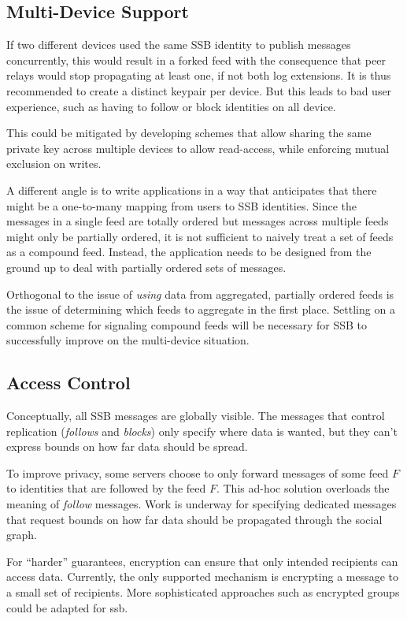 \documentclass[10pt,sigconf,rewiew]{acmart}
\begin{document}
\subsection{Multi-Device Support}

If two different devices used the same SSB identity to publish messages concurrently, this would result in a forked feed with the consequence that peer relays would stop propagating at least one, if not both log extensions. It is thus recommended to create a distinct keypair per device. But this leads to bad user experience, such as having to follow or block identities on all device.

This could be mitigated by developing schemes that allow sharing the same private key across multiple devices to allow read-access, while enforcing mutual exclusion on writes.

A different angle is to write applications in a way that anticipates that there might be a one-to-many mapping from users to SSB identities. Since the messages in a single feed are totally ordered but messages across multiple feeds might only be partially ordered, it is not sufficient to naively treat a set of feeds as a compound feed. Instead, the application needs to be designed from the ground up to deal with partially ordered sets of messages.

Orthogonal to the issue of \textit{using} data from aggregated, partially ordered feeds is the issue of determining which feeds to aggregate in the first place. Settling on a common scheme for signaling compound feeds will be necessary for SSB to successfully improve on the multi-device situation.

\subsection{Access Control}

Conceptually, all SSB messages are globally visible. The messages that control replication (\textit{follows} and \textit{blocks}) only specify where data is wanted, but they can't express bounds on how far data should be spread.

To improve privacy, some servers choose to only forward messages of some feed $F$ to identities that are followed by the feed $F$. This ad-hoc solution overloads the meaning of \textit{follow} messages. Work is underway for specifying dedicated messages that request bounds on how far data should be propagated through the social graph.

For ``harder'' guarantees, encryption can ensure that only intended recipients can access data. Currently, the only supported mechanism is encrypting a message to a small set of recipients. More sophisticated approaches such as encrypted groups could be adapted for ssb.
\end{document}

